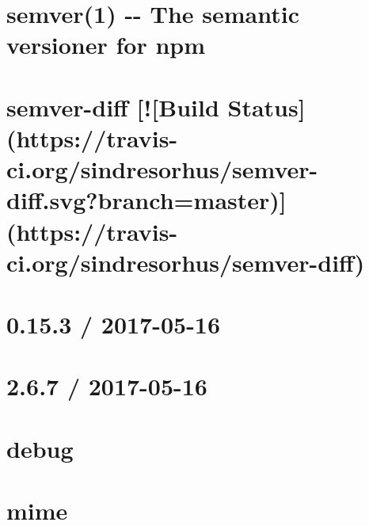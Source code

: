\documentclass[twoside]{book}
\newcommand{\+}{\discretionary{\mbox{\scriptsize$\hookleftarrow$}}{}{}}
\begin{document}
\chapter{semver(1) -\/-\/ The semantic versioner for npm}
\label{md__c_1_workspace_demo_src_main_script_node_modules_semver__r_e_a_d_m_e}

\chapter{semver-\/diff \mbox{[}!\mbox{[}Build Status\mbox{]}(https\+://travis-\/ci.org/sindresorhus/semver-\/diff.svg?branch=master)\mbox{]}(https\+://travis-\/ci.org/sindresorhus/semver-\/diff)}
\label{md__c_1_workspace_demo_src_main_script_node_modules_semver-diff_readme}

\chapter{0.15.3 / 2017-\/05-\/16}
\label{md__c_1_workspace_demo_src_main_script_node_modules_send__h_i_s_t_o_r_y}

\chapter{2.6.7 / 2017-\/05-\/16}
\label{md__c_1_workspace_demo_src_main_script_node_modules_send_node_modules_debug__c_h_a_n_g_e_l_o_g}

\chapter{debug}
\label{md__c_1_workspace_demo_src_main_script_node_modules_send_node_modules_debug__r_e_a_d_m_e}

\chapter{mime}
\label{md__c_1_workspace_demo_src_main_script_node_modules_send_node_modules_mime__r_e_a_d_m_e}

\end{document}
